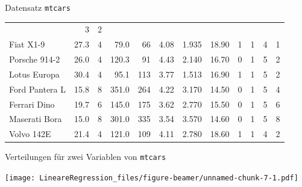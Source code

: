 \documentclass[
  ignorenonframetext,
]{beamer}
\newenvironment{Shaded}{\begin{snugshade}}{\end{snugshade}}
\newcommand{\DataTypeTok}[1]{\textcolor[rgb]{0.74,0.68,0.62}{\underline{#1}}}
\newcommand{\DecValTok}[1]{\textcolor[rgb]{0.27,0.67,0.26}{#1}}
\newcommand{\KeywordTok}[1]{\textcolor[rgb]{0.26,0.66,0.93}{\textbf{#1}}}
\newcommand{\NormalTok}[1]{\textcolor[rgb]{0.74,0.68,0.62}{#1}}
\newcommand{\OperatorTok}[1]{\textcolor[rgb]{0.74,0.68,0.62}{#1}}
\begin{document}
\begin{frame}{Datensatz \texttt{mtcars}}
\begin{longtable}[]{@{}lrrrrrrrrrrr@{}}
& 3 & 2\tabularnewline
Fiat X1-9 & 27.3 & 4 & 79.0 & 66 & 4.08 & 1.935 & 18.90 & 1 & 1 & 4 &
1\tabularnewline
Porsche 914-2 & 26.0 & 4 & 120.3 & 91 & 4.43 & 2.140 & 16.70 & 0 & 1 & 5
& 2\tabularnewline
Lotus Europa & 30.4 & 4 & 95.1 & 113 & 3.77 & 1.513 & 16.90 & 1 & 1 & 5
& 2\tabularnewline
Ford Pantera L & 15.8 & 8 & 351.0 & 264 & 4.22 & 3.170 & 14.50 & 0 & 1 &
5 & 4\tabularnewline
Ferrari Dino & 19.7 & 6 & 145.0 & 175 & 3.62 & 2.770 & 15.50 & 0 & 1 & 5
& 6\tabularnewline
Maserati Bora & 15.0 & 8 & 301.0 & 335 & 3.54 & 3.570 & 14.60 & 0 & 1 &
5 & 8\tabularnewline
Volvo 142E & 21.4 & 4 & 121.0 & 109 & 4.11 & 2.780 & 18.60 & 1 & 1 & 4 &
2\tabularnewline
\bottomrule
\end{longtable}

\end{frame}

\begin{frame}[fragile]{Verteilungen für zwei Variablen von
\texttt{mtcars}}
\protect\hypertarget{verteilungen-fur-zwei-variablen-von-mtcars}{}

\begin{Shaded}
\end{Shaded}

\texttt{[image: LineareRegression\_files/figure-beamer/unnamed-chunk-7-1.pdf]}

\end{frame}
\end{document}
